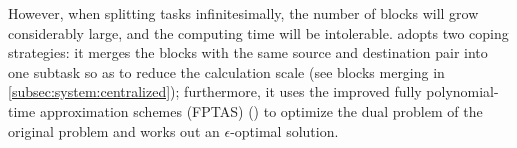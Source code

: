 However, when splitting tasks infinitesimally, the number of blocks will grow considerably large, and the computing time will be intolerable. \name adopts two coping strategies: it merges the blocks with the same source and destination pair into one subtask so as to reduce the calculation scale (see blocks merging in \Section\ref{subsec:system:centralized}); furthermore, it uses the improved fully polynomial-time approximation schemes (FPTAS) (\cite{fleischer2000approximating}) to optimize the dual problem of the original problem and works out an $\epsilon$-optimal solution. 
